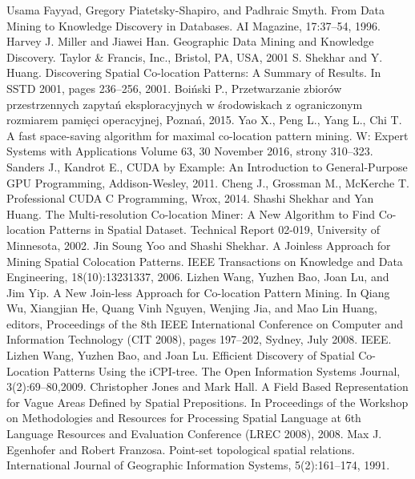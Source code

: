 \documentclass[12pt]{article}
\begin{document}
\newpage

\begin{thebibliography}{}
Usama Fayyad, Gregory Piatetsky-Shapiro, and Padhraic Smyth. From Data Mining to Knowledge Discovery in Databases. AI Magazine, 17:37–54, 1996.
 Harvey J. Miller and Jiawei Han. Geographic Data Mining and Knowledge Discovery.
Taylor \& Francis, Inc., Bristol, PA, USA, 2001
 S. Shekhar and Y. Huang. Discovering Spatial Co-location Patterns: A Summary of Results. In SSTD 2001, pages 236–256, 2001.
 Boiński P., Przetwarzanie zbiorów przestrzennych zapytań eksploracyjnych w środowiskach z ograniczonym rozmiarem pamięci operacyjnej, Poznań, 2015.
Yao X., Peng L., Yang L., Chi T. A fast space-saving algorithm for maximal co-location pattern mining. W: Expert Systems with Applications Volume 63, 30 November 2016, strony 310–323.
Sanders J., Kandrot E., CUDA by Example: An Introduction to General-Purpose GPU Programming, Addison-Wesley, 2011.
Cheng J., Grossman M., McKerche T. Professional CUDA C Programming, Wrox, 2014.
Shashi Shekhar and Yan Huang. The Multi-resolution Co-location Miner: A New Algorithm to Find Co-location Patterns in Spatial Dataset. Technical Report 02-019, University of Minnesota, 2002.
Jin Soung Yoo and Shashi Shekhar. A Joinless Approach for Mining Spatial Colocation Patterns. IEEE Transactions on Knowledge and Data Engineering, 18(10):13231337, 2006.
Lizhen Wang, Yuzhen Bao, Joan Lu, and Jim Yip. A New Join-less Approach for Co-location Pattern Mining. In Qiang Wu, Xiangjian He, Quang Vinh Nguyen, Wenjing Jia, and Mao Lin Huang, editors, Proceedings of the 8th IEEE International
Conference on Computer and Information Technology (CIT 2008), pages 197–202, Sydney, July 2008. IEEE.
Lizhen Wang, Yuzhen Bao, and Joan Lu. Efficient Discovery of Spatial Co-Location Patterns Using the iCPI-tree. The Open Information Systems Journal, 3(2):69–80,2009.
Christopher Jones and Mark Hall. A Field Based Representation for Vague Areas Defined by Spatial Prepositions. In Proceedings of the Workshop on Methodologies and Resources for Processing Spatial Language at 6th Language Resources and Evaluation Conference (LREC 2008), 2008.
Max J. Egenhofer and Robert Franzosa. Point-set topological spatial relations. International Journal of Geographic Information Systems, 5(2):161–174, 1991.

\end{thebibliography}
\end{document}
